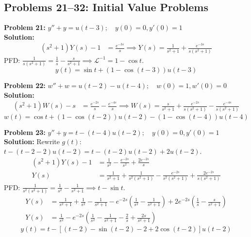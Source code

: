 \documentclass[11pt, letterpaper]{article}
\theoremstyle{definition}
\theoremstyle{remark}
\newcommand{\Lap}{\mathcal{L}}
\begin{document}
\subsection{Problems 21–32: Initial Value Problems}

\textbf{Problem 21:} $y''+y = u(t-3); \quad y(0)=0, y'(0)=1$
\\[4pt]
\textbf{Solution:}
\begin{align*}
(s^2+1)Y(s) - 1 &= \frac{e^{-3s}}{s} \implies Y(s) = \frac{1}{s^2+1} + \frac{e^{-3s}}{s(s^2+1)}
\end{align*}
PFD: $\frac{1}{s(s^2+1)} = \frac{1}{s} - \frac{s}{s^2+1} \implies \Lap^{-1} = 1 - \cos t$.
\[
y(t) = \sin t + (1 - \cos(t-3))u(t-3)
\]

\textbf{Problem 22:} $w''+w = u(t-2)-u(t-4); \quad w(0)=1, w'(0)=0$
\\[4pt]
\textbf{Solution:}
\begin{align*}
(s^2+1)W(s) - s &= \frac{e^{-2s}}{s} - \frac{e^{-4s}}{s} \implies W(s) = \frac{s}{s^2+1} + \frac{e^{-2s}}{s(s^2+1)} - \frac{e^{-4s}}{s(s^2+1)}
\end{align*}
\[
w(t) = \cos t + (1-\cos(t-2))u(t-2) - (1-\cos(t-4))u(t-4)
\]

\textbf{Problem 23:} $y''+y = t - (t-4)u(t-2); \quad y(0)=0, y'(0)=1$
\\[4pt]
\textbf{Solution:}
Rewrite $g(t)$: $t - (t-2-2)u(t-2) = t - (t-2)u(t-2) + 2u(t-2)$.
\begin{align*}
(s^2+1)Y(s) - 1 &= \frac{1}{s^2} - \frac{e^{-2s}}{s^2} + \frac{2e^{-2s}}{s} \\
Y(s) &= \frac{1}{s^2+1} + \frac{1}{s^2(s^2+1)} - \frac{e^{-2s}}{s^2(s^2+1)} + \frac{2e^{-2s}}{s(s^2+1)}
\end{align*}
PFD: $\frac{1}{s^2(s^2+1)} = \frac{1}{s^2} - \frac{1}{s^2+1} \implies t - \sin t$.
\begin{align*}
Y(s) &= \frac{1}{s^2+1} + \frac{1}{s^2} - \frac{1}{s^2+1} - e^{-2s}\left(\frac{1}{s^2} - \frac{1}{s^2+1}\right) + 2e^{-2s}\left(\frac{1}{s} - \frac{s}{s^2+1}\right) \\
Y(s) &= \frac{1}{s^2} - e^{-2s}\left(\frac{1}{s^2} - \frac{1}{s^2+1} - \frac{2}{s} + \frac{2s}{s^2+1}\right)
\end{align*}
\[
y(t) = t - \left[ (t-2) - \sin(t-2) - 2 + 2\cos(t-2) \right] u(t-2)
\]
\end{document}
